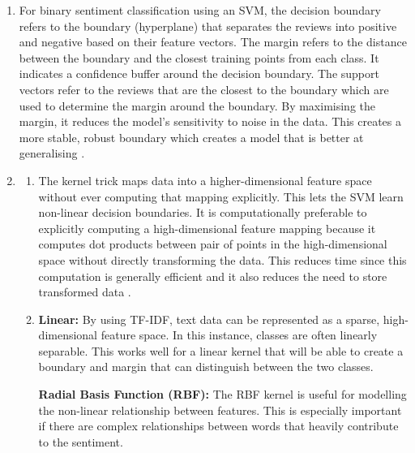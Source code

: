 \begin{enumerate}[label=\textbf{(\alph*)}, leftmargin=*, align=left]
    \item For binary sentiment classification using an SVM, the decision boundary refers to the boundary (hyperplane) that separates the reviews into positive and negative based on their
          feature vectors. The margin refers to the distance between the boundary and the closest training points from each class. It indicates a confidence buffer around the decision boundary.
          The support vectors refer to the reviews that are the closest to the boundary which are used to determine the margin around the boundary. By maximising the margin, it reduces the 
          model's sensitivity to noise in the data. This creates a more stable, robust boundary which creates a model that is better at generalising \parencite{geron2019hands}.

    \newpage
    \item   \begin{enumerate}[label=\roman*., topsep=0pt, itemsep=2pt]
                \item The kernel trick maps data into a higher-dimensional feature space without ever computing that mapping explicitly. This lets the SVM learn non-linear decision
                      boundaries. It is computationally preferable to explicitly computing a high-dimensional feature mapping because it computes dot products between pair of points
                      in the high-dimensional space without directly transforming the data. This reduces time since this computation is generally efficient and it also reduces the need
                      to store transformed data \parencite{geron2019hands}.
                    
                \item \textbf{Linear:} By using TF-IDF, text data can be represented as a sparse, high-dimensional feature space. In this instance, classes are often linearly separable.
                      This works well for a linear kernel that will be able to create a boundary and margin that can distinguish between the two classes.
                
                      \textbf{Radial Basis Function (RBF):} The RBF kernel is useful for modelling the non-linear relationship between features. This is especially important if there 
                      are complex relationships between words that heavily contribute to the sentiment.
            \end{enumerate}
    
\end{enumerate}
